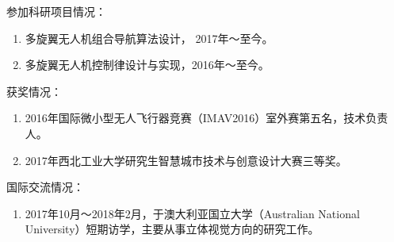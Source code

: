 参加科研项目情况：

\begin{enumerate}
	\item 多旋翼无人机组合导航算法设计， 2017年～至今。
	\item 多旋翼无人机控制律设计与实现，2016年～至今。
\end{enumerate}

获奖情况：

\begin{enumerate}
	\item 2016年国际微小型无人飞行器竞赛（IMAV2016）室外赛第五名，技术负责人。
	\item 2017年西北工业大学研究生智慧城市技术与创意设计大赛三等奖。
\end{enumerate}

国际交流情况：

\begin{enumerate}
	\item 2017年10月～2018年2月，于澳大利亚国立大学（Australian National University）短期访学，主要从事立体视觉方向的研究工作。
\end{enumerate}


